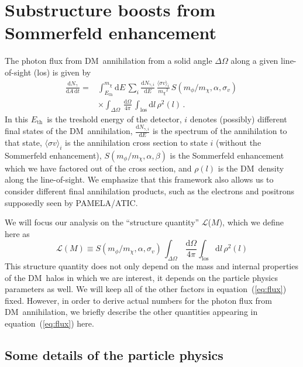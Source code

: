 \documentclass[aps,prd,twocolumn,amsmath,amssymb,floatfix,nofootinbib,10pt]{revtex4}
\newcommand{\DM}{DM}
\newcommand{\somm}{\ensuremath{S}}
\newcommand{\mdm}{\ensuremath{m_{\chi}}}
\newcommand{\mv}{\ensuremath{m_{\phi}}}
\newcommand{\dd}{\mathrm{d}}
\newcommand{\eqnname}{equation}
\newcommand{\Ngamma}{\ensuremath{N_{\gamma}}}
\newcommand{\Ngammai}{\ensuremath{N_{\gamma,i}}}
\newcommand{\Eth}{\ensuremath{E_{\mathrm{th}}}}
\newcommand{\sigmaannv}{\ensuremath{\langle\sigma v\rangle}}
\newcommand{\los}{los}
\newcommand{\sigv}{\ensuremath{\sigma_v}}
\newcommand{\lum}{\ensuremath{\mathcal{L}}}
\begin{document}
\section{Substructure boosts from Sommerfeld enhancement}
The photon flux from \DM\ annihilation from a solid angle
$\Delta\Omega$ along a given line-of-sight (\los) is given by
\begin{equation}\label{eq:flux}
\begin{split}
\frac{\dd \Ngamma}{\dd A \,\dd t}  = &
\int_{\Eth}^{\mdm}\dd E\, \sum_i \frac{\dd
\Ngammai}{\dd E} \,\frac{\sigmaannv_i}{\mdm^2}\,
\somm\left(\mv/\mdm,\alpha,\sigv\right)\,\\
& \times \int_{\Delta\Omega}\,\frac{\dd\Omega}{4\pi}\,\int_{\mathrm{\los}} \dd l\,
\rho^2(l)\, .
\end{split}
\end{equation}
In this \Eth\ is the treshold energy of the detector, $i$ denotes
(possibly) different final states of the \DM\ annihilation, $\frac{\dd
\Ngammai}{\dd E}$ is the spectrum of the annihilation to that state,
$\sigmaannv_i$ is the annihilation cross section to state $i$ (without
the Sommerfeld enhancement), $\somm\left(\mv/\mdm,\alpha,\beta\right)$
is the Sommerfeld enhancement which we have factored out of the cross
section, and $\rho(l)$ is the \DM\ density along the line-of-sight. We
emphasize that this framework also allows us to consider different
final annihilation products, such as the electrons and positrons
supposedly seen by PAMELA/ATIC.


We will focus our analysis on the ``structure quantity'' \lum($M$),
which we define here as
\begin{equation}\label{eq:structquant}
\lum(M)\equiv\somm\left(\mv/\mdm,\alpha,\sigv\right)\,\int_{\Delta\Omega}\,\frac{\dd\Omega}{4\pi}\int_{\mathrm{\los}}
\dd l\, \rho^2(l)
\end{equation}
This structure quantity does not only depend on the mass and internal
properties of the \DM\ halos in which we are interest, it depends on
the particle physics parameters as well. We will keep all of the other
factors in \eqnname\ (\ref{eq:flux}) fixed. However, in order to
derive actual numbers for the photon flux from \DM\ annihilation, we
briefly describe the other quantities appearing in \eqnname\
(\ref{eq:flux}) here.

\subsection{Some details of the particle physics}\label{sec:partphys}
\end{document}

